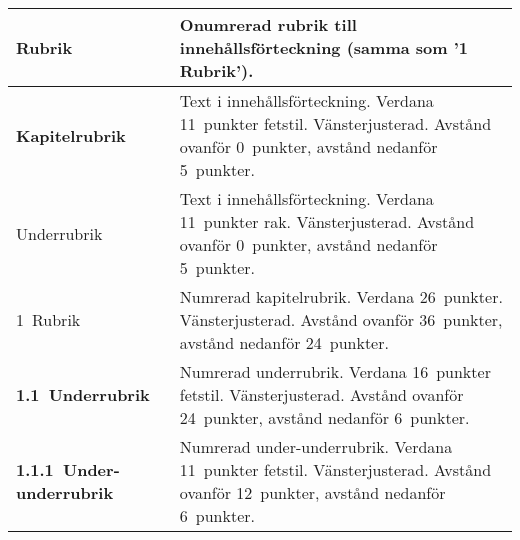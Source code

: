 \begin{longtable}{p{} p{}}
  \toprule
  {\sffamily\Large{}Rubrik} &
  Onumrerad rubrik till innehållsförteckning
  (samma som '1 Rubrik').
  \\
  \midrule
  {\sffamily\textbf{Kapitelrubrik}} &
  Text i innehållsförteckning. Verdana 11~punkter fetstil. Vänsterjusterad.
  Avstånd ovanför 0~punkter, avstånd nedanför 5~punkter.
  \\
  \midrule
  {\sffamily{}Underrubrik} &
  Text i innehållsförteckning. Verdana 11~punkter rak. Vänsterjusterad.
  Avstånd ovanför 0~punkter, avstånd nedanför 5~punkter.
  \\
  \midrule
  {\sffamily\Large{}1~Rubrik} &
  Numrerad kapitelrubrik. Verdana 26~punkter. Vänsterjusterad.
  Avstånd ovanför 36~punkter, avstånd nedanför 24~punkter.
  \\
  \midrule
  {\sffamily\bfseries\large{}1.1~Underrubrik} &
  Numrerad underrubrik. Verdana 16~punkter fetstil. Vänsterjusterad.
  Avstånd ovanför 24~punkter, avstånd nedanför 6~punkter.
  \\
  \midrule
  {\sffamily\bfseries\normalsize{}1.1.1~Under-underrubrik} &
  Numrerad under-underrubrik. Verdana 11~punkter fetstil. Vänsterjusterad.
  Avstånd ovanför 12~punkter, avstånd nedanför 6~punkter.
  \\
  \bottomrule
\end{longtable}


